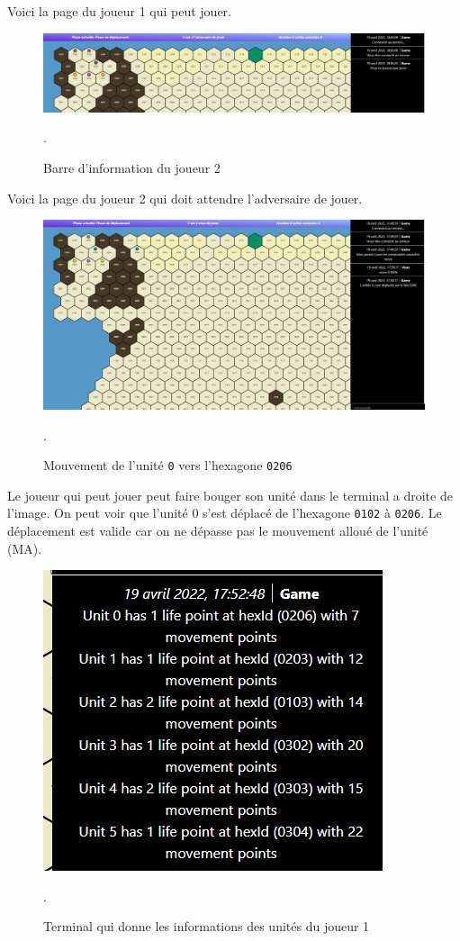 Voici la page du joueur 1 qui peut jouer.\\

\begin{figure}[H]
\centering
\includegraphics[scale=0.35]{data/joueur 2.jpg}
\caption{Barre d'information du joueur 2}.
\end{figure}

Voici la page du joueur 2 qui doit attendre l'adversaire de jouer.

\begin{figure}[H]
\centering
\includegraphics[scale=0.35]{data/move unit player 1.jpg}
\caption{Mouvement de l'unité \lstinline{0} vers l'hexagone \lstinline{0206}}.
\end{figure}

Le joueur qui peut jouer peut faire bouger son unité dans le terminal a droite de l'image.
On peut voir que l'unité 0 s'est déplacé de l'hexagone \lstinline{0102} à \lstinline{0206}. Le déplacement est valide car on ne dépasse pas le mouvement alloué de l'unité (MA).\\

\begin{figure}[H]
\centering
\includegraphics[scale=0.6]{data/info units.jpg}
\caption{Terminal qui donne les informations des unités du joueur 1 }.
\end{figure}

